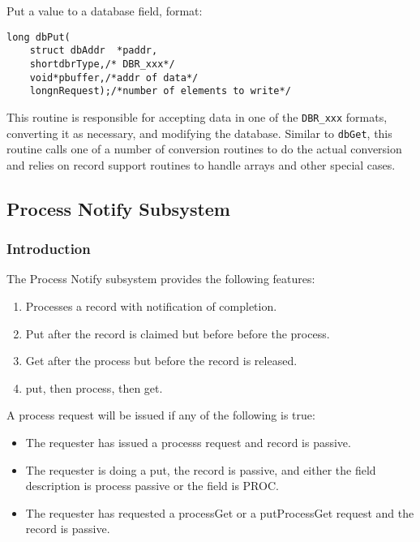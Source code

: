Put a value to a database field, format:

\begin{verbatim}
long dbPut(
    struct dbAddr  *paddr,
    shortdbrType,/* DBR_xxx*/
    void*pbuffer,/*addr of data*/
    longnRequest);/*number of elements to write*/
\end{verbatim}

This routine is responsible for accepting data in one of the \verb|DBR_xxx| formats, converting it as necessary, and modifying 
the database. Similar to \verb|dbGet|, this routine calls one of a number of conversion routines to do the actual conversion and 
relies on record support routines to handle arrays and other special cases.

\label{Process Notify Subsystem}
\subsection{Process Notify Subsystem}

\subsubsection{Introduction}

The Process Notify subsystem provides the following features:

\begin{enumerate}
\item Processes a record with notification of completion.
\item Put after the record is claimed but before before the process.
\item Get after the process but before the record is released.
\item put, then process, then get.
\end{enumerate}

A process request will be issued if any of the following is true:

\begin{itemize}
\item The requester has issued a processs request and record is passive.
\item The requester is doing a put, the record is passive, and either the field description is process passive or the field is PROC.
\item The requester has requested a processGet or a putProcessGet request and the record is passive.
\end{itemize}

